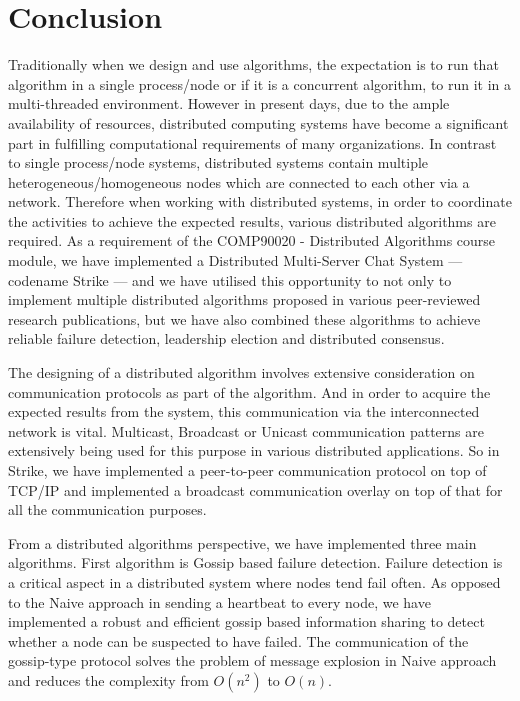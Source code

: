 \documentclass[dareport.tex]{subfiles}
\begin{document}
\section{Conclusion}

Traditionally when we design and use algorithms, the expectation is to run that algorithm in a single process/node or if it is a concurrent algorithm, to run it in a multi-threaded environment. However in present days, due to the ample availability of resources, distributed computing systems have become a significant part in fulfilling computational requirements of many organizations. In contrast to single process/node systems, distributed systems contain multiple heterogeneous/homogeneous nodes which are connected to each other via a network. Therefore when working with distributed systems, in order to coordinate the activities to achieve the expected results, various distributed algorithms are required. As a requirement of the COMP90020 - Distributed Algorithms course module, we have implemented a Distributed Multi-Server Chat System --- codename Strike --- and we have utilised this opportunity to not only to implement multiple distributed algorithms proposed in various peer-reviewed research publications, but we have also combined these algorithms to achieve reliable failure detection, leadership election and distributed consensus.

The designing of a distributed algorithm involves extensive consideration on communication protocols as part of the algorithm. And in order to acquire the expected results from the system, this communication via the interconnected network is vital. Multicast, Broadcast or Unicast communication patterns are extensively being used for this purpose in various distributed applications. So in Strike, we have implemented a peer-to-peer communication protocol on top of TCP/IP and implemented a broadcast communication overlay on top of that for all the communication purposes.

From a distributed algorithms perspective, we have implemented three main algorithms. First algorithm is Gossip based failure detection. Failure detection is a critical aspect in a distributed system where nodes tend fail often. As opposed to the Naive approach in sending a heartbeat to every node, we have implemented a robust and efficient gossip based information sharing to detect whether a node can be suspected to have failed. The communication of the gossip-type protocol solves the problem of message explosion in Naive approach and reduces the complexity from $ O(n^2) $ to $ O(n) $.
\end{document}
